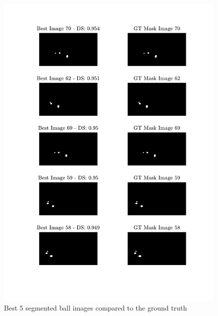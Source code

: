 \documentclass[conference]{IEEEtran}
\begin{document}
    \begin{figure}[htbp]
        \centering
        \includegraphics[width=\columnwidth]{figures/best.pdf}
        \caption{Best 5 segmented ball images compared to the ground truth\label{apx:best}}
    \end{figure}
\end{document}
